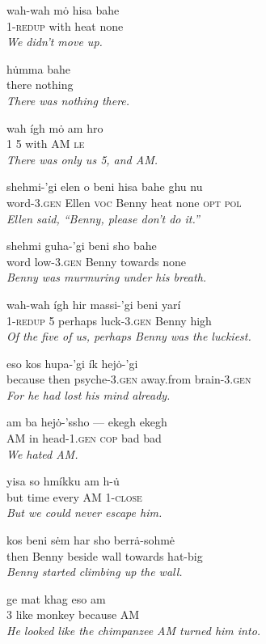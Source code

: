 \documentclass{article}[10pt]
\begin{document}
\begin{exe}
\ex
\gll wah-wah m\.{o} hisa bahe\\
1-\textsc{redup} with heat none\\
\trans \emph{We didn't move up.}

\ex
\gll h\.{u}mma bahe\\
there nothing\\
\trans \emph{There was nothing there.}

\ex
\gll wah \'{i}gh m\.{o} am hro\\
1 5 with AM \textsc{le}\\
\trans \emph{There was only us 5, and AM.}

\ex 
\gll shehmi-'gi elen o beni hisa bahe ghu nu\\
word-3.\textsc{gen} Ellen \textsc{voc} Benny heat none \textsc{opt} \textsc{pol}\\
\trans \emph{Ellen said, ``Benny, please don't do it.''}

\ex
\gll shehmi guha-'gi beni sho bahe\\
word low-3.\textsc{gen} Benny towards none\\
\trans \emph{Benny was murmuring under his breath.}

\ex
\gll wah-wah \'{i}gh hir massi-'gi beni yar\'{i}\\
1-\textsc{redup} 5 perhaps luck-3.\textsc{gen} Benny high\\
\trans \emph{Of the five of us, perhaps Benny was the luckiest.}

\ex
\gll eso kos hupa-'gi \'{i}k hej\.{o}-'gi\\
because then psyche-3.\textsc{gen} away.from brain-3.\textsc{gen}\\
\trans \emph{For he had lost his mind already.}

\ex
\gll am ba hej\.{o}-'ssho --- ekegh ekegh\\
AM in head-1.\textsc{gen} \textsc{cop} bad bad\\
\trans \emph{We hated AM.}

\ex
\gll yisa so hm\'{i}kku am h-\.{u}\\
but time every AM 1-\textsc{close}\\
\trans \emph{But we could never escape him.}

\ex
\gll kos beni s\.{e}m har sho berr\.{a}-sohm\.{e}\\
then Benny beside wall towards hat-big\\
\trans \emph{Benny started climbing up the wall.}

\ex
\gll ge mat khag eso am\\
3 like monkey because AM\\
\trans \emph{He looked like the chimpanzee AM turned him into.}

\end{exe}
\end{document}
